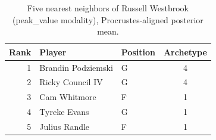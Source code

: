\begin{table}[htbp]
  \centering\small
  \begin{tabular}{rllc}
    \toprule
    Rank & Player & Position & Archetype \\
    \midrule
    1 & Brandin Podziemski & G & 4 \\
    2 & Ricky Council IV & G & 4 \\
    3 & Cam Whitmore & F & 1 \\
    4 & Tyreke Evans & G & 1 \\
    5 & Julius Randle & F & 1 \\
    \bottomrule
  \end{tabular}
  \caption{Five nearest neighbors of Russell Westbrook (peak_value modality), Procrustes-aligned posterior mean.}
  \label{tab:Russell_Westbrook_neighbors_peak_value}
\end{table}

